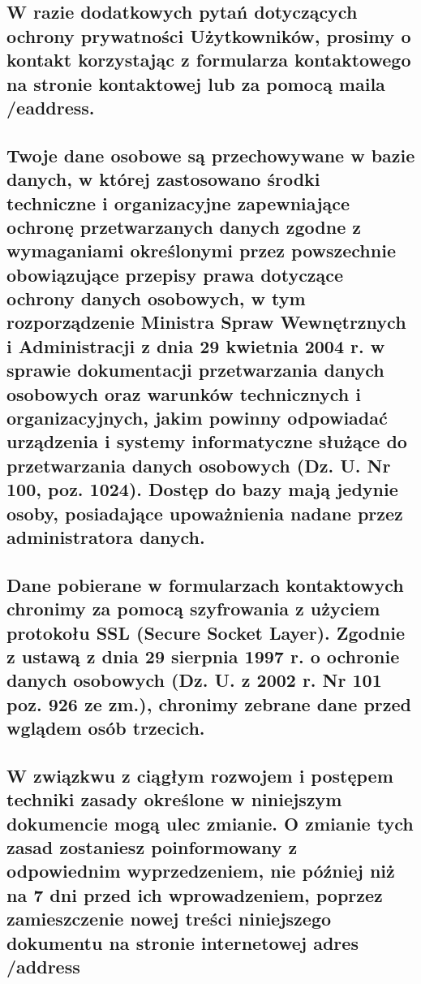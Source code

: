 \subsection{W razie dodatkowych pytań dotyczących ochrony prywatności Użytkowników, prosimy o kontakt korzystając z formularza kontaktowego na stronie kontaktowej lub za pomocą maila /eaddress.}

\subsection{Twoje dane osobowe są przechowywane w bazie danych, w której zastosowano środki techniczne i organizacyjne zapewniające ochronę przetwarzanych danych zgodne z wymaganiami określonymi przez powszechnie obowiązujące przepisy prawa dotyczące ochrony danych osobowych, w tym rozporządzenie Ministra Spraw Wewnętrznych i Administracji z dnia 29 kwietnia 2004 r. w sprawie dokumentacji przetwarzania danych osobowych oraz warunków technicznych i organizacyjnych, jakim powinny odpowiadać urządzenia i systemy informatyczne służące do przetwarzania danych osobowych (Dz. U. Nr 100, poz. 1024). Dostęp do bazy mają jedynie osoby, posiadające upoważnienia nadane przez administratora danych.}

\subsection{Dane pobierane w formularzach kontaktowych chronimy za pomocą szyfrowania z użyciem protokołu SSL (Secure Socket Layer). Zgodnie z ustawą z dnia 29 sierpnia 1997 r. o ochronie danych osobowych (Dz. U. z 2002 r. Nr 101 poz. 926 ze zm.), chronimy zebrane dane przed wglądem osób trzecich.}

\subsection{W związkwu z ciągłym rozwojem i postępem techniki zasady określone w niniejszym dokumencie mogą ulec zmianie. O zmianie tych zasad zostaniesz poinformowany z odpowiednim wyprzedzeniem, nie później niż na 7 dni przed ich wprowadzeniem, poprzez zamieszczenie nowej treści niniejszego dokumentu na stronie internetowej adres /address } 

 
